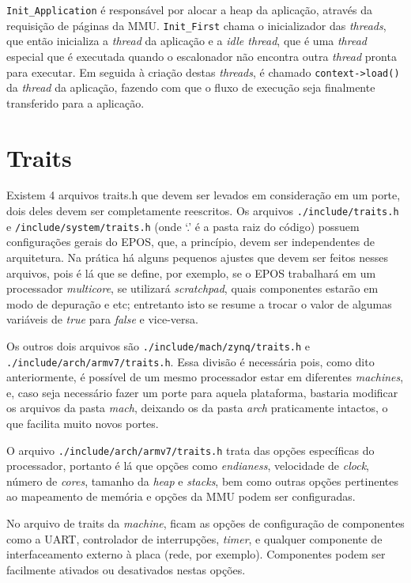 \verb+Init_Application+ é responsável por alocar a heap da aplicação, através da requisição de páginas da MMU. \verb+Init_First+ chama o inicializador das \emph{threads}, que então inicializa a \emph{thread} da aplicação e a \emph{idle thread}, que é uma \emph{thread} especial que é executada quando o escalonador não encontra outra \emph{thread} pronta para executar. Em seguida à criação destas \emph{threads}, é chamado \verb+context->load()+ da \emph{thread} da aplicação, fazendo com que o fluxo de execução seja finalmente transferido para a aplicação.

\section{Traits}
\label{sec:traits}
Existem 4 arquivos traits.h que devem ser levados em consideração em um porte, dois deles devem ser completamente reescritos. Os arquivos \verb+./include/traits.h+ e \verb+/include/system/traits.h+ (onde `.' é a pasta raiz do código) possuem configurações gerais do EPOS, que, a princípio, devem ser independentes de arquitetura. Na prática há alguns pequenos ajustes que devem ser feitos nesses arquivos, pois é lá que se define, por exemplo, se o EPOS trabalhará em um processador \emph{multicore}, se utilizará \emph{scratchpad}, quais componentes estarão em modo de depuração e etc; entretanto isto se resume a trocar o valor de algumas variáveis de \emph{true} para \emph{false} e vice-versa.

Os outros dois arquivos são \verb+./include/mach/zynq/traits.h+ e\\ \verb+./include/arch/armv7/traits.h+. Essa divisão é necessária pois, como dito anteriormente, é possível de um mesmo processador estar em diferentes \emph{machines}, e, caso seja necessário fazer um porte para aquela plataforma, bastaria modificar os arquivos da pasta \emph{mach}, deixando os da pasta \emph{arch} praticamente intactos, o que facilita muito novos portes.

O arquivo \verb+./include/arch/armv7/traits.h+ trata das opções específicas do processador, portanto é lá que opções como \emph{endianess}, velocidade de \emph{clock}, número de \emph{cores}, tamanho da \emph{heap} e \emph{stacks}, bem como outras opções pertinentes ao mapeamento de memória e opções da MMU podem ser configuradas.

No arquivo de traits da \emph{machine}, ficam as opções de configuração de componentes como a UART, controlador de interrupções, \emph{timer}, e qualquer componente de interfaceamento externo à placa (rede, por exemplo). Componentes podem ser facilmente ativados ou desativados nestas opções.

